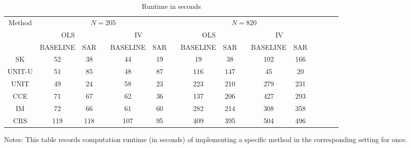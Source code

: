 \documentclass[preprint]{imsart}
\numberwithin{equation}{section}
\theoremstyle{plain}
\theoremstyle{definition}
\renewcommand{\(}{\left(}
\renewcommand{\)}{\right)}
\renewcommand{\[}{\left[}
\renewcommand{\]}{\right]}
\begin{document}
{\begin{table}[ht!]
	\centering
	\caption{Runtime in seconds}
	 \label{inferenceruntimes}
	\renewcommand{\arraystretch}{1.5}
	\begin{threeparttable}
	\begin{tabular}{cccccccccccccccc}
		\hline
		\hline
	Method	& \multicolumn{5}{c}{$N=205$} & & \multicolumn{5}{c}{$N=820$} \\
		\cline{2-6} \cline{8-12}
		& \multicolumn{2}{c}{OLS} && \multicolumn{2}{c}{IV} 		&& \multicolumn{2}{c}{OLS} && \multicolumn{2}{c}{IV}\\
		\cline{2-3} \cline{5-6} \cline{8-9} \cline{11-12}
		& BASELINE & SAR & & BASELINE & SAR &	& BASELINE & SAR & & BASELINE & SAR\\
		\hline
SK     & 52  & 38  &  & 44  & 19 &  & 19  & 38  &  & 102 & 166 \\
UNIT-U & 51  & 85  &  & 48  & 87 &  & 116 & 147 &  & 45  & 20  \\
UNIT   & 49  & 24  &  & 58  & 23 &  & 223 & 210 &  & 279 & 231 \\
CCE    & 71  & 67  &  & 62  & 36 &  & 137 & 206 &  & 427 & 293 \\
IM     & 72  & 66  &  & 61  & 60 &  & 282 & 214 &  & 308 & 358 \\
CRS    & 119 & 118 &  & 107 & 95 &  & 409 & 395 &  & 504 & 496\\
		\hline
	\end{tabular}
\begin{tablenotes}
	\item Notes: 
	This table records computation runtime (in seconds) of implementing a specific method in the corresponding setting for once. 

\end{tablenotes}
\end{threeparttable}
\end{table}}
\end{document}
